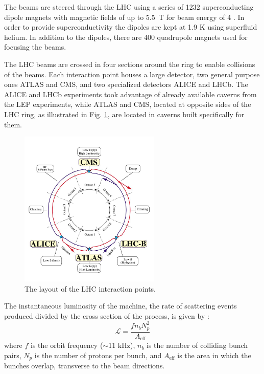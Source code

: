 The beams are steered through the LHC 
using a series of 1232 superconducting dipole magnets with magnetic fields 
of up to 5.5~T for beam energy of 4 \TeV. In order to provide superconductivity the 
dipoles are kept at 1.9 K using superfluid helium.
In addition to the dipoles, there are 400 quadrupole magnets used
for focusing the beams.

The LHC beams are
crossed in four sections around the ring to enable collisions of the beams. Each interaction point
houses a large detector, two general purpose ones ATLAS and CMS, and two specialized detectors
ALICE and LHCb. The ALICE and LHCb experiments took advantage of already available caverns from
the LEP experiments, while ATLAS and CMS, located at opposite sides of the LHC ring, as illustrated
in Fig. \ref{fig:lhc}, are located in caverns built specifically for them.

\begin{figure}[htbp]
\centering
\includegraphics[width=0.6\textwidth]{plots/intro/lhc.jpg}
\caption{The layout of the LHC interaction points.\label{fig:lhc}}
\end{figure}

The instantaneous luminosity of the machine, \ie the rate of scattering events produced divided
by the cross section of the process, is given by \cite{Aaij:2011er}:
\begin{equation}
\mathcal{L}=\frac{f n_b N_p^2}{A_{\mathrm{eff}}}
\end{equation}
where $f$ is the orbit frequency ($\sim$11 kHz), $n_b$ is the number of colliding bunch pairs, 
$N_p$ is the number of protons per bunch, and $A_{\mathrm{eff}}$ is the area in which the bunches
overlap, transverse to the beam directions.



